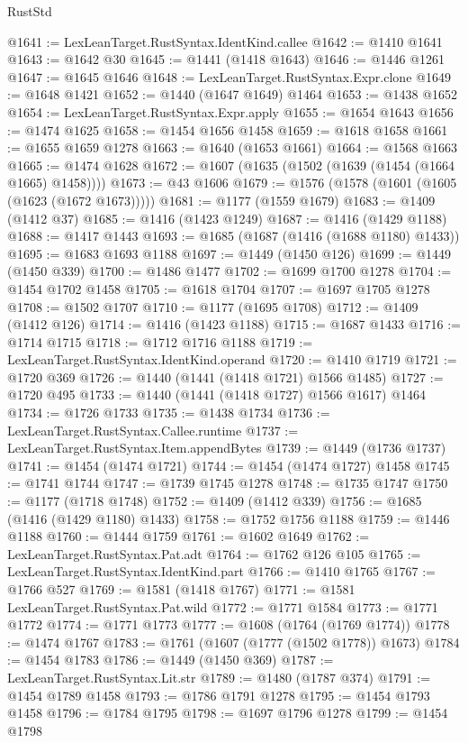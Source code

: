 \begin{lexlean}{RustStd}
\begin{coremodule}
{\begin{coremodule}
{{{{{{{{{{{{{{{{{{{{{{{{{{{{{{{@1641 := LexLeanTarget.RustSyntax.IdentKind.callee
@1642 := @1410 @1641
@1643 := @1642 @30
@1645 := @1441 (@1418 @1643)
@1646 := @1446 @1261
@1647 := @1645 @1646
@1648 := LexLeanTarget.RustSyntax.Expr.clone
@1649 := @1648 @1421
@1652 := @1440 (@1647 @1649) @1464
@1653 := @1438 @1652
@1654 := LexLeanTarget.RustSyntax.Expr.apply
@1655 := @1654 @1643
@1656 := @1474 @1625
@1658 := @1454 @1656 @1458
@1659 := @1618 @1658
@1661 := @1655 @1659 @1278
@1663 := @1640 (@1653 @1661)
@1664 := @1568 @1663
@1665 := @1474 @1628
@1672 := @1607 (@1635 (@1502 (@1639 (@1454 (@1664 @1665) @1458))))
@1673 := @43 @1606
@1679 := @1576 (@1578 (@1601 (@1605 (@1623 (@1672 @1673)))))
@1681 := @1177 (@1559 @1679)
@1683 := @1409 (@1412 @37)
@1685 := @1416 (@1423 @1249)
@1687 := @1416 (@1429 @1188)
@1688 := @1417 @1443
@1693 := @1685 (@1687 (@1416 (@1688 @1180) @1433))
@1695 := @1683 @1693 @1188
@1697 := @1449 (@1450 @126)
@1699 := @1449 (@1450 @339)
@1700 := @1486 @1477
@1702 := @1699 @1700 @1278
@1704 := @1454 @1702 @1458
@1705 := @1618 @1704
@1707 := @1697 @1705 @1278
@1708 := @1502 @1707
@1710 := @1177 (@1695 @1708)
@1712 := @1409 (@1412 @126)
@1714 := @1416 (@1423 @1188)
@1715 := @1687 @1433
@1716 := @1714 @1715
@1718 := @1712 @1716 @1188
@1719 := LexLeanTarget.RustSyntax.IdentKind.operand
@1720 := @1410 @1719
@1721 := @1720 @369
@1726 := @1440 (@1441 (@1418 @1721) @1566 @1485)
@1727 := @1720 @495
@1733 := @1440 (@1441 (@1418 @1727) @1566 @1617) @1464
@1734 := @1726 @1733
@1735 := @1438 @1734
@1736 := LexLeanTarget.RustSyntax.Callee.runtime
@1737 := LexLeanTarget.RustSyntax.Item.appendBytes
@1739 := @1449 (@1736 @1737)
@1741 := @1454 (@1474 @1721)
@1744 := @1454 (@1474 @1727) @1458
@1745 := @1741 @1744
@1747 := @1739 @1745 @1278
@1748 := @1735 @1747
@1750 := @1177 (@1718 @1748)
@1752 := @1409 (@1412 @339)
@1756 := @1685 (@1416 (@1429 @1180) @1433)
@1758 := @1752 @1756 @1188
@1759 := @1446 @1188
@1760 := @1444 @1759
@1761 := @1602 @1649
@1762 := LexLeanTarget.RustSyntax.Pat.adt
@1764 := @1762 @126 @105
@1765 := LexLeanTarget.RustSyntax.IdentKind.part
@1766 := @1410 @1765
@1767 := @1766 @527
@1769 := @1581 (@1418 @1767)
@1771 := @1581 LexLeanTarget.RustSyntax.Pat.wild
@1772 := @1771 @1584
@1773 := @1771 @1772
@1774 := @1771 @1773
@1777 := @1608 (@1764 (@1769 @1774))
@1778 := @1474 @1767
@1783 := @1761 (@1607 (@1777 (@1502 @1778)) @1673)
@1784 := @1454 @1783
@1786 := @1449 (@1450 @369)
@1787 := LexLeanTarget.RustSyntax.Lit.str
@1789 := @1480 (@1787 @374)
@1791 := @1454 @1789 @1458
@1793 := @1786 @1791 @1278
@1795 := @1454 @1793 @1458
@1796 := @1784 @1795
@1798 := @1697 @1796 @1278
@1799 := @1454 @1798
}}}}}}}}}}}}}}}}}}}}}}}}}}}}}}}
\end{coremodule}}
\end{coremodule}
\end{lexlean}
